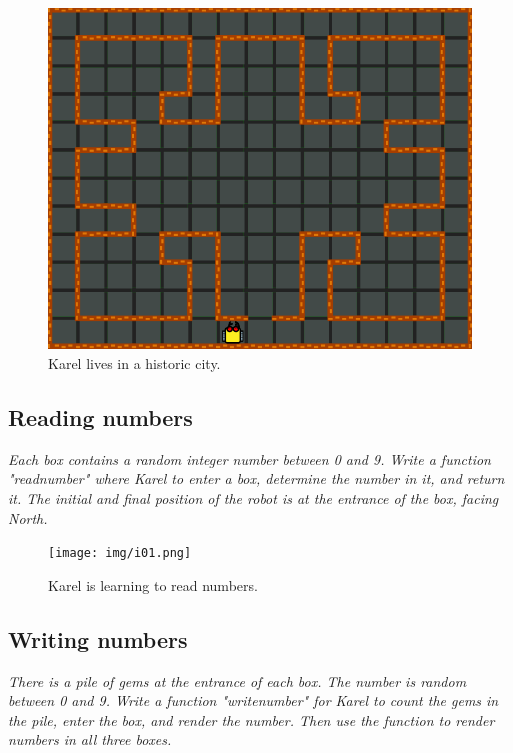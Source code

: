 \begin{figure}[!ht]
\begin{center}
\includegraphics[height=0.4\textwidth]{img/f14b.png}
\end{center}
\vspace{-4mm}
\caption{Karel lives in a historic city.}
\label{fig:g10c}
\end{figure}

\newpage

\subsection{Reading numbers}

{\em Each box contains a random integer number between 0 and 9. Write a function "readnumber" where Karel to enter a box, determine the number in it, and return it. The initial and final position of the robot is at the entrance of the box, facing North. }\\[-9mm]

\begin{figure}[!ht]
\begin{center}
\texttt{[image: img/i01.png]}
\end{center}
\vspace{-4mm}
\caption{Karel is learning to read numbers.}
\vspace{-12mm}
\label{fig:g10}
\end{figure}


\subsection{Writing numbers}

{\em There is a pile of gems at the entrance of each box. The number is random between 0 and 9. Write a function "writenumber" for Karel to count the gems in the pile, enter the box, and render the number. Then use the function to render numbers in all three boxes.}\\[-9mm]


